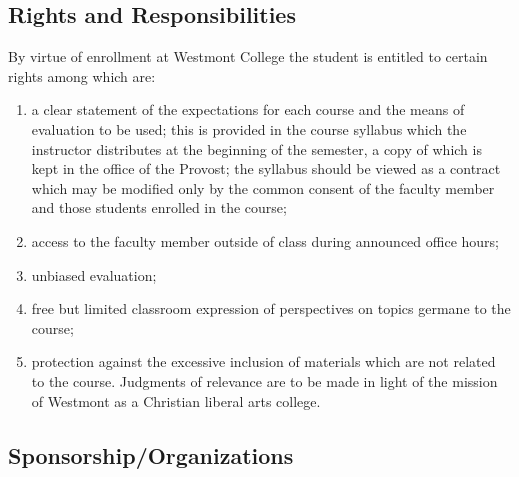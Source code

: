 	\subsection{Rights and Responsibilities}
		By virtue of enrollment at Westmont College the student is entitled to certain rights among which are:
		\begin{enumerate}[label=\alph*)]
			\item{a clear statement of the expectations for each course and the means of evaluation to be used; this is provided in the course syllabus which the instructor distributes at the beginning of the semester, a copy of which is kept in the office of the Provost; the syllabus should be viewed as a contract which may be modified only by the common consent of the faculty member and those students enrolled in the course;
			}
			\item{access to the faculty member outside of class during announced office hours;
			}
			\item{unbiased evaluation;
			}
			\item{free but limited classroom expression of perspectives on topics germane to the course;
			}
			\item{protection against the excessive inclusion of materials which are not related to the course. Judgments of relevance are to be made in light of the mission of Westmont as a Christian liberal arts college.
			}
		\end{enumerate}
	\subsection{Sponsorship/Organizations} 

